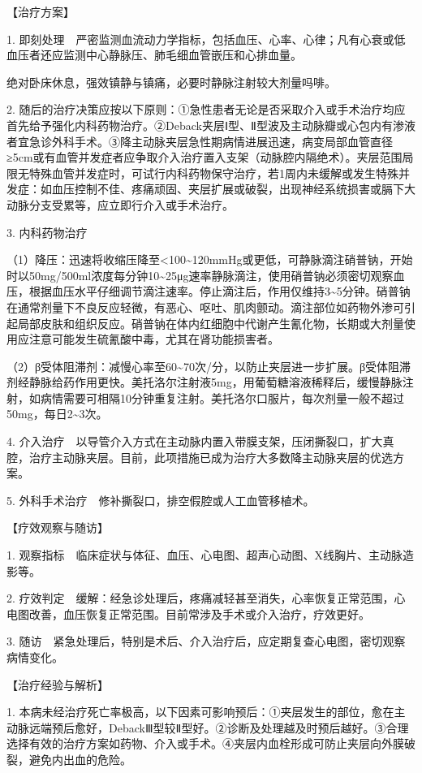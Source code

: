 【治疗方案】

1.
即刻处理　严密监测血流动力学指标，包括血压、心率、心律；凡有心衰或低血压者还应监测中心静脉压、肺毛细血管嵌压和心排血量。

绝对卧床休息，强效镇静与镇痛，必要时静脉注射较大剂量吗啡。

2.
随后的治疗决策应按以下原则：①急性患者无论是否采取介入或手术治疗均应首先给予强化内科药物治疗。②Deback夹层Ⅰ型、Ⅱ型波及主动脉瓣或心包内有渗液者宜急诊外科手术。③降主动脉夹层急性期病情进展迅速，病变局部血管直径≥5cm或有血管并发症者应争取介入治疗置入支架（动脉腔内隔绝术）。夹层范围局限无特殊血管并发症时，可试行内科药物保守治疗，若1周内未缓解或发生特殊并发症：如血压控制不佳、疼痛顽固、夹层扩展或破裂，出现神经系统损害或膈下大动脉分支受累等，应立即行介入或手术治疗。

3. 内科药物治疗

（1）降压：迅速将收缩压降至\textless{}100\textasciitilde{}120mmHg或更低，可静脉滴注硝普钠，开始时以50mg/500ml浓度每分钟10\textasciitilde{}25μg速率静脉滴注，使用硝普钠必须密切观察血压，根据血压水平仔细调节滴注速率。停止滴注后，作用仅维持3\textasciitilde{}5分钟。硝普钠在通常剂量下不良反应轻微，有恶心、呕吐、肌肉颤动。滴注部位如药物外渗可引起局部皮肤和组织反应。硝普钠在体内红细胞中代谢产生氰化物，长期或大剂量使用应注意可能发生硫氰酸中毒，尤其在肾功能损害者。

（2）β受体阻滞剂：减慢心率至60\textasciitilde{}70次/分，以防止夹层进一步扩展。β受体阻滞剂经静脉给药作用更快。美托洛尔注射液5mg，用葡萄糖溶液稀释后，缓慢静脉注射，如病情需要可相隔10分钟重复注射。美托洛尔口服片，每次剂量一般不超过50mg，每日2\textasciitilde{}3次。

4.
介入治疗　以导管介入方式在主动脉内置入带膜支架，压闭撕裂口，扩大真腔，治疗主动脉夹层。目前，此项措施已成为治疗大多数降主动脉夹层的优选方案。

5. 外科手术治疗　修补撕裂口，排空假腔或人工血管移植术。

【疗效观察与随访】

1.
观察指标　临床症状与体征、血压、心电图、超声心动图、X线胸片、主动脉造影等。

2.
疗效判定　缓解：经急诊处理后，疼痛减轻甚至消失，心率恢复正常范围，心电图改善，血压恢复正常范围。目前常涉及手术或介入治疗，疗效更好。

3.
随访　紧急处理后，特别是术后、介入治疗后，应定期复查心电图，密切观察病情变化。

【治疗经验与解析】

1.
本病未经治疗死亡率极高，以下因素可影响预后：①夹层发生的部位，愈在主动脉远端预后愈好，DebackⅢ型较Ⅱ型好。②诊断及处理越及时预后越好。③合理选择有效的治疗方案如药物、介入或手术。④夹层内血栓形成可防止夹层向外膜破裂，避免内出血的危险。

